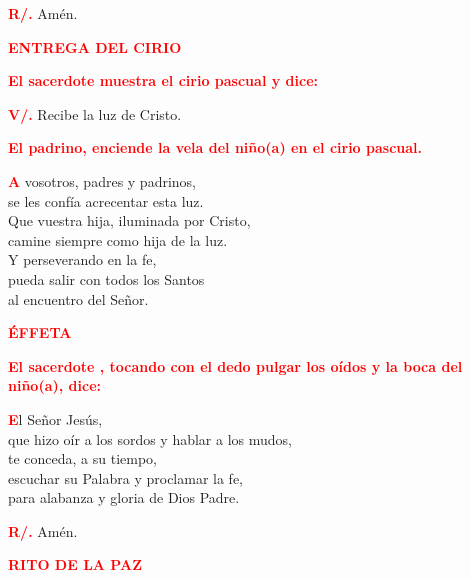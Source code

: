 \documentclass[12pt, letterpaper]{report}
\begin{document}
\noindent
\Large {\bfseries \textcolor{red}{R/.}} \hspace{0.5cm} Am\'en. \newline

\Large {\bfseries \textcolor{red}{ENTREGA DEL CIRIO}} \newline

\large {\bfseries \textcolor{red}{El sacerdote muestra el cirio pascual y dice:}} \newline

\noindent
\Large {\bfseries \textcolor{red}{V/.}} \hspace{0.5cm} Recibe la luz de Cristo. \newline

\large {\bfseries \textcolor{red}{El padrino, enciende la vela del ni\~no(a) en el cirio pascual.}}

\lettrine[lines=1]{\bfseries \textcolor{red}{A}}{} \Large vosotros, padres y padrinos, \\
se les conf\'ia acrecentar esta luz.\\
Que vuestra hija, iluminada por Cristo, \\
camine siempre como hija de la luz. \\
Y perseverando en la fe, \\
pueda salir con todos los Santos \\
al encuentro del Se\~nor. \newline

\newpage

\Large {\bfseries \textcolor{red}{ \'EFFETA}} \newline

\large {\bfseries \textcolor{red}{El sacerdote , tocando con el dedo pulgar los o\'idos y la boca del ni\~no(a), dice:}}

\lettrine[lines=1]{\bfseries \textcolor{red}{E}}{}\Large l Se\~nor Jes\'us, \\
que hizo o\'ir a los sordos y hablar a los mudos, \\
te conceda, a su tiempo, \\
escuchar su Palabra y proclamar la fe, \\
para alabanza y gloria de Dios Padre. \newline

\noindent
\Large {\bfseries \textcolor{red}{R/.}} \hspace{0.5cm} Am\'en. \newline

\Large {\bfseries \textcolor{red}{RITO DE LA PAZ}} \newline
\end{document}
